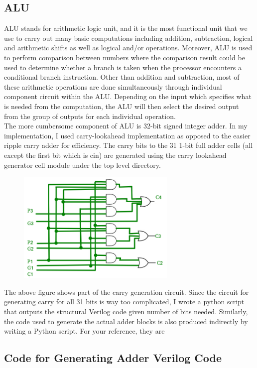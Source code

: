 \documentclass{article}
\begin{document}
		\subsection{ALU}
		ALU stands for arithmetic logic unit, and it is the most functional unit that we use to carry out many basic computations including addition, subtraction, logical and arithmetic shifts as well as logical and/or operations. Moreover, ALU is used to perform comparison between numbers where the comparison result could be used to determine whether a branch is taken when the processor encounters a conditional branch instruction. Other than addition and subtraction, most of these arithmetic operations are done simultaneously through individual component circuit within the ALU. Depending on the input which specifies what is needed from the computation, the ALU will then select the desired output from the group of outputs for each individual operation. \\
		The more cumbersome component of ALU is 32-bit signed integer adder. In my implementation, I used carry-lookahead implementation as opposed to the easier ripple carry adder for efficiency. The carry bits to the 31 1-bit full adder cells (all except the first bit which is cin) are generated using the carry lookahead generator cell module under the top level directory. 
		\begin{figure}[h]
			\centering
			\includegraphics[width=3in]{cla}
		\end{figure}
		\newpage
		The above figure shows part of the carry generation circuit. Since the circuit for generating carry for all 31 bits is way too complicated, I wrote a python script that outputs the structural Verilog code given number of bits needed. Similarly, the code used to generate the actual adder blocks is also produced indirectly by writing a Python script. For your reference, they are
		\subsection{Code for Generating Adder Verilog Code}
		
\end{document}
